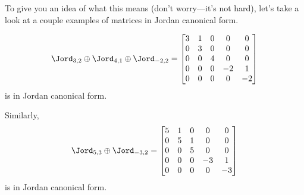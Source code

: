 To give you an idea of what this means (don't worry---it's not hard), let's take a look at a couple examples of matrices in Jordan canonical form.
\begin{exm}{}{}
	\begin{equation}
		\Jord _{3,2}\oplus \Jord _{4,1}\oplus \Jord _{-2,2}=\begin{bmatrix}3 & 1 & 0 & 0 & 0 \\ 0 & 3 & 0 & 0 & 0 \\ 0 & 0 & 4 & 0 & 0 \\ 0 & 0 & 0 & -2 & 1 \\ 0 & 0 & 0 & 0 & -2\end{bmatrix}
	\end{equation}
	is in Jordan canonical form.
	
	Similarly,
	\begin{equation}
		\Jord _{5,3}\oplus \Jord _{-3,2}=\begin{bmatrix}5 & 1 & 0 & 0 & 0 \\ 0 & 5 & 1 & 0 & 0 \\ 0 & 0 & 5 & 0 & 0 \\ 0 & 0 & 0 & -3 & 1 \\ 0 & 0 & 0 & 0 & -3\end{bmatrix}
	\end{equation}
	is in Jordan canonical form.
\end{exm}
